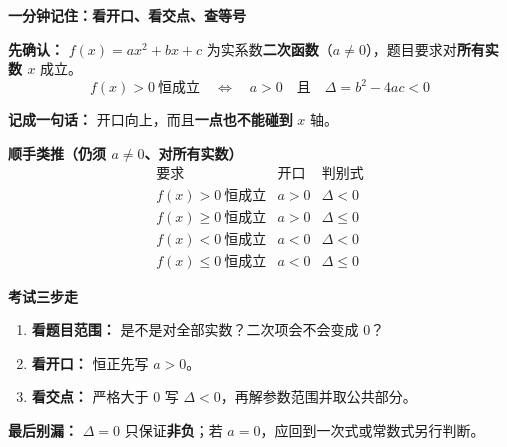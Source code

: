 \begin{summarybox}
  \textbf{\textcolor{CSummary}{一分钟记住：看开口、看交点、查等号}}

  \textbf{先确认：} $f(x)=ax^2+bx+c$ 为实系数\textbf{二次函数}（$a\ne0$），题目要求对\textbf{所有实数 $x$} 成立。
  \[
    \boxed{f(x)>0\ \text{恒成立}\quad\Longleftrightarrow\quad a>0\quad\text{且}\quad\Delta=b^2-4ac<0}
  \]

  \textbf{记成一句话：} 开口向上，而且\textbf{一点也不能碰到} $x$ 轴。

  \medskip
  \textbf{\textcolor{CSummary}{顺手类推（仍须 $a\ne0$、对所有实数）}}
  \[
    \begin{array}{c|c|c}
      \text{要求} & \text{开口} & \text{判别式}\\ \hline
      f(x)>0\ \text{恒成立} & a>0 & \Delta<0\\
      f(x)\ge0\ \text{恒成立} & a>0 & \Delta\le0\\
      f(x)<0\ \text{恒成立} & a<0 & \Delta<0\\
      f(x)\le0\ \text{恒成立} & a<0 & \Delta\le0
    \end{array}
  \]

  \textbf{\textcolor{CSummary}{考试三步走}}
  \begin{enumerate}[leftmargin=*,itemsep=.25em]
    \item \textbf{看题目范围：} 是不是对全部实数？二次项会不会变成 $0$？
    \item \textbf{看开口：} 恒正先写 $a>0$。
    \item \textbf{看交点：} 严格大于 $0$ 写 $\Delta<0$，再解参数范围并取公共部分。
  \end{enumerate}

  \textbf{最后别漏：} $\Delta=0$ 只保证\textbf{非负}；若 $a=0$，应回到一次式或常数式另行判断。
\end{summarybox}
